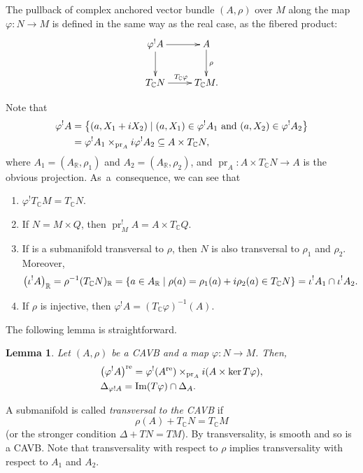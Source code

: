 \documentclass[11pt]{article}
\numberwithin{equation}{section}
\numberwithin{equation}{section}
\newtheorem{Lemma}[Theorem]{Lemma}
\newcommand{\R}{{\mathbb{R}}}
\newcommand{\C}{{\mathbb{C}}}
\DeclareMathOperator{\im}{Im}
\DeclareMathOperator{\pr}{pr}
\DeclareMathOperator{\real}{re}
\begin{document}
The pullback of complex anchored vector bundle $(A, \rho) $ over $M$ along the map $\varphi\colon N\to M$ is defined in the same way as the real case, as the fibered product:
\[
\xymatrix{\varphi^! A\ar[d]\ar[r] & A \ar[d]^{\rho}\\
T_{\C}N\ar[r]^{T_{\C}\varphi} & T_{\C}M.}
\]

Note that
\begin{align*}
\varphi^! A&{}=\bigl\{(a, X_1+{\rm i}X_2) \mid  (a,X_1)\in \varphi^! A_1\ \text{and}\ (a,X_2)\in \varphi^! A_2\bigr\}\\
&{}=\varphi^! A_1 \times_{\pr_A} {\rm i}\varphi^! A_2\subseteq A\times T_{\C}N,
\end{align*}
where $A_1=(A_{\R}, \rho_1)$ and $A_2=(A_{\R}, \rho_2)$, and $\pr_A\colon A\times T_{\C}N\to A$ is the obvious projection.
As~a~consequence, we can see that
\begin{enumerate}\itemsep=0pt
\item $\varphi^!T_{\C}M=T_{\C}N$.
\item If $N=M\times Q$, then $\pr_M ^! A=A\times T_{\C}Q$.
\item If  is a submanifold transversal to $\rho$, then $N$ is also transversal to $\rho_1$ and $\rho_2$. Moreover,
\[
\bigl(\iota^! A\bigr)_{\R}=\rho^{-1}(T_{\C}N)_{\R}=\{a\in A_{\R}\mid \rho(a)=\rho_1(a)+{\rm i}\rho_2(a)\in T_{\C}N\}=\iota^{!}A_1\cap \iota^{!}A_2.
\]
\item If $\rho$ is injective, then $\varphi^! A=(T_{\C}\varphi)^{-1}(A)$.
\end{enumerate}

 The following lemma is straightforward.

\begin{Lemma}\label{repartbackward}
Let $(A,\rho)$ be a CAVB and a map $\varphi\colon N\to M$. Then,
\begin{align*} %
&\bigl(\varphi^! A\bigr)^{\real}=\varphi^! (A^{\real})\times_{\pr_A}{\rm i}(A\times \ker T\varphi),\\
&\Delta_{\varphi! A}=\im(T\varphi)\cap \Delta_{A}.
\end{align*}
\end{Lemma}

A submanifold  is called {\em transversal to the CAVB} if
\[\rho(A)+T_{\C}N=T_{\C}M\]
(or the stronger condition $\Delta+TN=TM$). By transversality,  is smooth and so is a CAVB. Note that transversality with respect to $\rho$ implies transversality with respect to $A_1$ and $A_2$.
\end{document}
